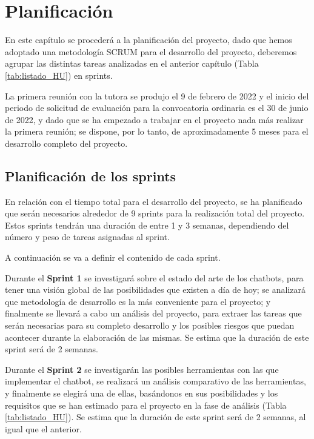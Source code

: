 \chapter{Planificación}

En este capítulo se procederá a la planificación del proyecto, dado que hemos adoptado una metodología SCRUM para el desarrollo del proyecto, deberemos agrupar las distintas tareas analizadas en el anterior capítulo (Tabla \ref{tab:listado_HU}) en sprints.

La primera reunión con la tutora se produjo el 9 de febrero de 2022 y el inicio del periodo de solicitud de evaluación para la convocatoria ordinaria es el 30 de junio de 2022, y dado que se ha empezado a trabajar en el proyecto nada más realizar la primera reunión; se dispone, por lo tanto, de aproximadamente 5 meses para el desarrollo completo del proyecto.

\section{Planificación de los sprints}

En relación con el tiempo total para el desarrollo del proyecto, se ha planificado que serán necesarios alrededor de 9 sprints para la realización total del proyecto. Estos sprints tendrán una duración de entre 1 y 3 semanas, dependiendo del número y peso de tareas asignadas al sprint.

A continuación se va a definir el contenido de cada sprint.

Durante el \textbf{Sprint 1} se investigará sobre el estado del arte de los chatbots, para tener una visión global de las posibilidades que existen a día de hoy; se analizará que metodología de desarrollo es la más conveniente para el proyecto; y finalmente se llevará a cabo un análisis del proyecto, para extraer las tareas que serán necesarias para su completo desarrollo y los posibles riesgos que puedan acontecer durante la elaboración de las mismas. Se estima que la duración de este sprint será de 2 semanas.

Durante el \textbf{Sprint 2} se investigarán las posibles herramientas con las que implementar el chatbot, se realizará un análisis comparativo de las herramientas, y finalmente se elegirá una de ellas, basándonos en sus posibilidades y los requisitos que se han estimado para el proyecto en la fase de análisis (Tabla \ref{tab:listado_HU}). Se estima que la duración de este sprint será de 2 semanas, al igual que el anterior.

